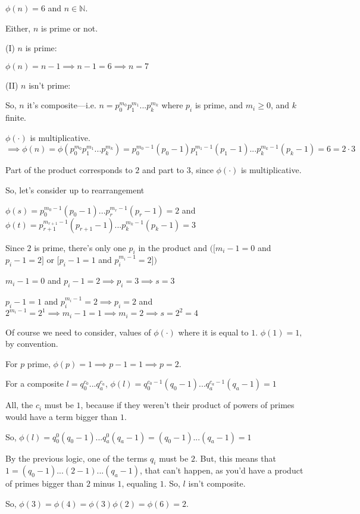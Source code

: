 \documentclass{article}
\begin{document}
$\phi(n) = 6$ and $n \in \mathbb{N}$.

Either, $n$ is prime or not.

(I) $n$ is prime:

$\phi(n) = n-1 \implies n-1 = 6 \implies n = 7$

(II) $n$ isn't prime:

So, $n$ it's composite---i.e. $n = p_0^{m_0}
p_1^{m_1}...p_k^{m_k}$ where $p_i$ is prime, and $m_i\geq 0$, and $k$
finite.

$\phi(\cdot)$ is multiplicative.
$\implies \phi(n) = \phi(p_0^{m_0}
p_1^{m_1}...p_k^{m_k}) = p_0^{m_0-1}(p_0-1)
p_1^{m_1-1}(p_1-1)...p_k^{m_k-1}(p_k -1) = 6 = 2\cdot 3$

Part of the product corresponds to $2$ and part to $3$, since
$\phi(\cdot)$ is multiplicative.

So, let's consider up to rearrangement

$\phi(s) = p_0^{m_0-1}(p_0-1)...p_r^{m_r-1}(p_r-1) = 2$
and $\phi(t) = p_{r+1}^{m_{r+1}-1}(p_{r+1}-1)...p_{k}^{m_k-1}(p_k-1) = 3$


Since $2$ is prime, there's only one $p_i$ in the product and $([m_i -1=
0$ and $p_i-1= 2]$   or
$[p_i-1= 1$ and $p_i^{m_i-1} = 2])$

$m_i -1=
0$ and $p_i-1= 2 \implies p_i = 3 \implies s = 3$

$p_i-1= 1$ and $p_i^{m_i-1} = 2 \implies p_i = 2$ and
$2^{m_i-1}=2^1 \implies m_i-1 = 1 \implies m_i = 2 \implies s = 2^2 =4$

Of course we need to consider, values of $\phi(\cdot)$ where it is
equal to $1$.
$\phi(1)= 1,$ by convention.

For $p$ prime, $\phi(p) = 1\implies p-1 = 1 \implies p = 2.$

For a composite $l = q_0^{c_0}...q_a^{c_a}$, $\phi(l) =
q_0^{c_0-1}(q_0-1)...q_a^{c_a-1}(q_a-1)= 1$

All, the $c_i$ must be $1$, because if they weren't
their product of powers of primes would have a term bigger than $1$.

So, $\phi(l) = q_0^{0}(q_0-1)...q_a^{0}(q_a-1) = (q_0-1)...(q_a-1) =
1$

By the previous logic, one of the terms $q_i$ must be $2$. But, this
means that $1 = (q_0-1)...(2-1)...(q_a-1)$, that can't happen, as you'd have a product of primes bigger than $2$ minus
$1$, equaling $1$. So, $l$ isn't composite.


So, $\phi(3) = \phi(4) = \phi(3) \phi(2) = \phi(6) = 2$.
\end{document}
